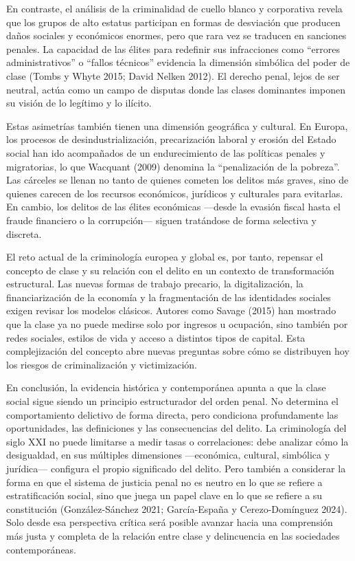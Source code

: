 \documentclass[
  spanish,
  letterpaper,
  DIV=11,
  numbers=noendperiod]{scrreprt}
\begin{document}
En contraste, el análisis de la criminalidad de cuello blanco y
corporativa revela que los grupos de alto estatus participan en formas
de desviación que producen daños sociales y económicos enormes, pero que
rara vez se traducen en sanciones penales. La capacidad de las élites
para redefinir sus infracciones como ``errores administrativos'' o
``fallos técnicos'' evidencia la dimensión simbólica del poder de clase
(Tombs y Whyte 2015; David Nelken 2012). El derecho penal, lejos de ser
neutral, actúa como un campo de disputas donde las clases dominantes
imponen su visión de lo legítimo y lo ilícito.

Estas asimetrías también tienen una dimensión geográfica y cultural. En
Europa, los procesos de desindustrialización, precarización laboral y
erosión del Estado social han ido acompañados de un endurecimiento de
las políticas penales y migratorias, lo que Wacquant (2009) denomina la
``penalización de la pobreza''. Las cárceles se llenan no tanto de
quienes cometen los delitos más graves, sino de quienes carecen de los
recursos económicos, jurídicos y culturales para evitarlas. En cambio,
los delitos de las élites económicas ---desde la evasión fiscal hasta el
fraude financiero o la corrupción--- siguen tratándose de forma
selectiva y discreta.

El reto actual de la criminología europea y global es, por tanto,
repensar el concepto de clase y su relación con el delito en un contexto
de transformación estructural. Las nuevas formas de trabajo precario, la
digitalización, la financiarización de la economía y la fragmentación de
las identidades sociales exigen revisar los modelos clásicos. Autores
como Savage (2015) han mostrado que la clase ya no puede medirse solo
por ingresos u ocupación, sino también por redes sociales, estilos de
vida y acceso a distintos tipos de capital. Esta complejización del
concepto abre nuevas preguntas sobre cómo se distribuyen hoy los riesgos
de criminalización y victimización.

En conclusión, la evidencia histórica y contemporánea apunta a que la
clase social sigue siendo un principio estructurador del orden penal. No
determina el comportamiento delictivo de forma directa, pero condiciona
profundamente las oportunidades, las definiciones y las consecuencias
del delito. La criminología del siglo XXI no puede limitarse a medir
tasas o correlaciones: debe analizar cómo la desigualdad, en sus
múltiples dimensiones ---económica, cultural, simbólica y jurídica---
configura el propio significado del delito. Pero también a considerar la
forma en que el sistema de justicia penal no es neutro en lo que se
refiere a estratificación social, sino que juega un papel clave en lo
que se refiere a su constitución (González-Sánchez 2021; García-España y
Cerezo-Domínguez 2024). Solo desde esa perspectiva crítica será posible
avanzar hacia una comprensión más justa y completa de la relación entre
clase y delincuencia en las sociedades contemporáneas.
\end{document}
